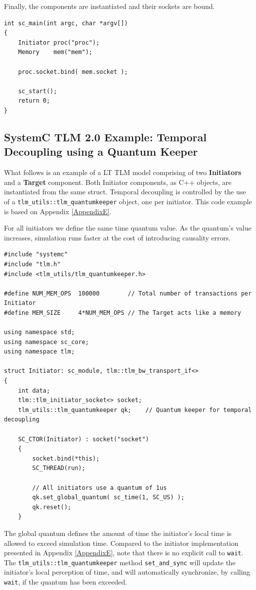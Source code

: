 \documentclass[11pt]{article}
\begin{document}
Finally, the components are instantiated and their sockets are bound.
\begin{verbatim}
int sc_main(int argc, char *argv[])
{
    Initiator proc("proc");
    Memory    mem("mem");

    proc.socket.bind( mem.socket );

    sc_start();
    return 0;
}
\end{verbatim}

\clearpage
\subsection{SystemC TLM 2.0 Example: Temporal Decoupling using a Quantum Keeper}
\label{AppendixEB}
What follows is an example of a LT TLM model comprising of two \textbf{Initiators} and a \textbf{Target} component.
Both Initiator components, as C++ objects, are instantiated from the same struct.
Temporal decoupling is controlled by the use of a \texttt{tlm\_utils::tlm\_quantumkeeper} object, one per initiator.
This code example is based on Appendix \ref{AppendixE}.

For all initiators we define the same time quantum value. As the quantum's value increases, simulation runs faster at the cost of introducing causality errors.
\begin{verbatim}
#include "systemc"
#include "tlm.h"
#include <tlm_utils/tlm_quantumkeeper.h>

#define NUM_MEM_OPS  100000        // Total number of transactions per Initiator
#define MEM_SIZE     4*NUM_MEM_OPS // The Target acts like a memory

using namespace std;
using namespace sc_core;
using namespace tlm;

struct Initiator: sc_module, tlm::tlm_bw_transport_if<>
{
    int data;
    tlm::tlm_initiator_socket<> socket; 
    tlm_utils::tlm_quantumkeeper qk;    // Quantum keeper for temporal decoupling

    SC_CTOR(Initiator) : socket("socket")
    {
        socket.bind(*this);
        SC_THREAD(run);

        // All initiators use a quantum of 1us
        qk.set_global_quantum( sc_time(1, SC_US) );
        qk.reset();
    }
\end{verbatim}

The global quantum defines the amount of time the initiator's local time is allowed to exceed simulation time.
Compared to the initiator implementation presented in Appendix \ref{AppendixE}, note that there is no explicit call to \texttt{wait}.
The \texttt{tlm\_utils::tlm\_quantumkeeper} method \texttt{set\_and\_sync} will update the initiator's local perception of time, and
will automatically synchronize, by calling \texttt{wait}, if the quantum has been exceeded.
\end{document}
